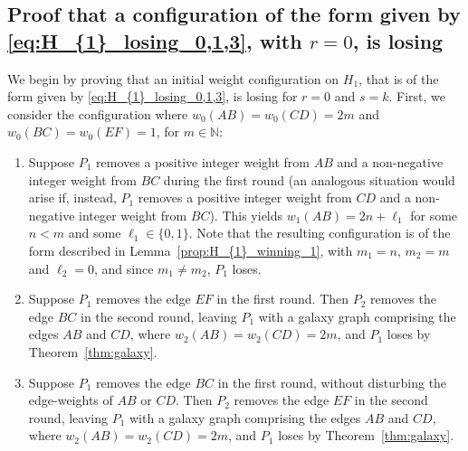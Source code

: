 \documentclass[11pt,reqno]{amsart}
\theoremstyle{definition}
\theoremstyle{definition}
\begin{document}
\subsection{Proof that a configuration of the form given by \eqref{eq:H_{1}_losing_0,1,3}, with $r=0$, is losing}\label{subsec:proof_eq_H_{1}_losing_0}
We begin by proving that an initial weight configuration on $H_{1}$, that is of the form given by \eqref{eq:H_{1}_losing_0,1,3}, is losing for $r=0$ and $s=k$. First, we consider the configuration where $w_{0}(AB)=w_{0}(CD)=2m$ and $w_{0}(BC)=w_{0}(EF)=1$, for $m \in \mathbb{N}$:
\begin{enumerate}
\item Suppose $P_{1}$ removes a positive integer weight from $AB$ and a non-negative integer weight from $BC$ during the first round (an analogous situation would arise if, instead, $P_{1}$ removes a positive integer weight from $CD$ and a non-negative integer weight from $BC$). This yields $w_{1}(AB)=2n+\ell_{1}$ for some $n<m$ and some $\ell_{1}\in \{0,1\}$. Note that the resulting configuration is of the form described in Lemma~\ref{prop:H_{1}_winning_1}, with $m_{1}=n$, $m_{2}=m$ and $\ell_{2}=0$, and since $m_{1}\neq m_{2}$, $P_{1}$ loses.

\item Suppose $P_{1}$ removes the edge $EF$ in the first round. Then $P_{2}$ removes the edge $BC$ in the second round, leaving $P_{1}$ with a galaxy graph comprising the edges $AB$ and $CD$, where $w_{2}(AB)=w_{2}(CD)=2m$, and $P_{1}$ loses by Theorem~\ref{thm:galaxy}.

\item Suppose $P_{1}$ removes the edge $BC$ in the first round, without disturbing the edge-weights of $AB$ or $CD$. Then $P_{2}$ removes the edge $EF$ in the second round, leaving $P_{1}$ with a galaxy graph comprising the edges $AB$ and $CD$, where $w_{2}(AB)=w_{2}(CD)=2m$, and $P_{1}$ loses by Theorem~\ref{thm:galaxy}.
\end{enumerate}
\end{document}
